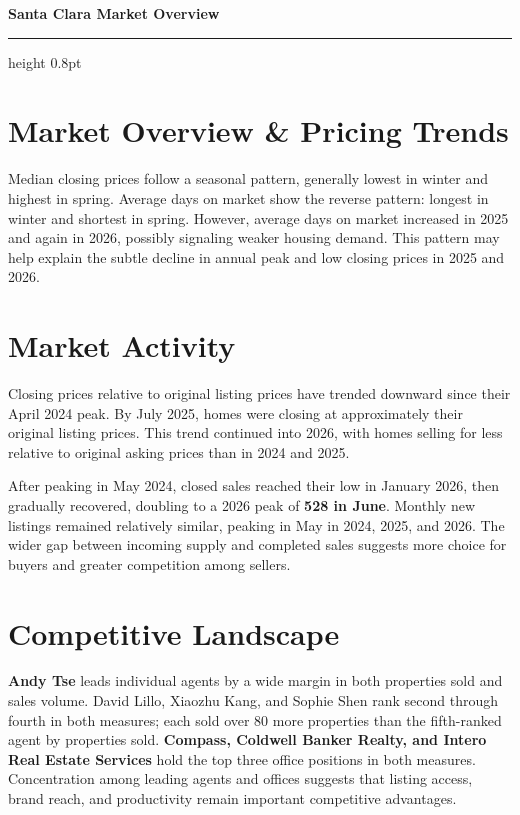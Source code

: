 \documentclass[10pt,letterpaper]{article}
\begin{document}
{\LARGE\bfseries\color{navy} Santa Clara Market Overview}\par
\vspace{6pt}
{\color{navy}\hrule height 0.8pt}

\vspace{7pt}
\begin{minipage}[t]{0.455\textwidth}
\vspace{0pt}
\setlength{\parskip}{4pt}
\section*{Market Overview \& Pricing Trends}
Median closing prices follow a seasonal pattern, generally lowest in winter and highest in spring. Average days on market show the reverse pattern: longest in winter and shortest in spring. However, average days on market increased in 2025 and again in 2026, possibly signaling weaker housing demand. This pattern may help explain the subtle decline in annual peak and low closing prices in 2025 and 2026.

\section*{Market Activity}
Closing prices relative to original listing prices have trended downward since their April 2024 peak. By July 2025, homes were closing at approximately their original listing prices. This trend continued into 2026, with homes selling for less relative to original asking prices than in 2024 and 2025.

After peaking in May 2024, closed sales reached their low in January 2026, then gradually recovered, doubling to a 2026 peak of \textbf{528 in June}. Monthly new listings remained relatively similar, peaking in May in 2024, 2025, and 2026. The wider gap between incoming supply and completed sales suggests more choice for buyers and greater competition among sellers.

\section*{Competitive Landscape}
\textbf{Andy Tse} leads individual agents by a wide margin in both properties sold and sales volume. David Lillo, Xiaozhu Kang, and Sophie Shen rank second through fourth in both measures; each sold over 80 more properties than the fifth-ranked agent by properties sold. \textbf{Compass, Coldwell Banker Realty, and Intero Real Estate Services} hold the top three office positions in both measures. Concentration among leading agents and offices suggests that listing access, brand reach, and productivity remain important competitive advantages.

\end{minipage}\hfill
\end{document}
